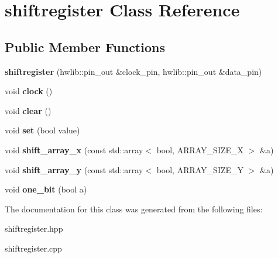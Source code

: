 \hypertarget{classshiftregister}{}\section{shiftregister Class Reference}
\label{classshiftregister}
\subsection*{Public Member Functions}
\begin{DoxyCompactItemize}
\item 
\mbox{\label{classshiftregister_ad72aff9322b0daf648fb3e083e64d2e6}} 
{\bfseries shiftregister} (hwlib\+::pin\+\_\+out \&clock\+\_\+pin, hwlib\+::pin\+\_\+out \&data\+\_\+pin)
\item 
\mbox{\label{classshiftregister_addd97c64978ac4cda3b1bb02e2fc5c71}} 
void {\bfseries clock} ()
\item 
\mbox{\label{classshiftregister_a1c6be3d5eb560d6d15319978948860c3}} 
void {\bfseries clear} ()
\item 
\mbox{\label{classshiftregister_a3a0cb78386c6b02fe35b945fac533309}} 
void {\bfseries set} (bool value)
\item 
\mbox{\label{classshiftregister_af1a05b416c4b2051187ab44ecf9d2222}} 
void {\bfseries shift\+\_\+array\+\_\+x} (const std\+::array$<$ bool, A\+R\+R\+A\+Y\+\_\+\+S\+I\+Z\+E\+\_\+X $>$ \&a)
\item 
\mbox{\label{classshiftregister_a565d20b6a224eb710be9624b305fd855}} 
void {\bfseries shift\+\_\+array\+\_\+y} (const std\+::array$<$ bool, A\+R\+R\+A\+Y\+\_\+\+S\+I\+Z\+E\+\_\+Y $>$ \&a)
\item 
\mbox{\label{classshiftregister_ab69b2359277f622a8b479ffda9a595ad}} 
void {\bfseries one\+\_\+bit} (bool a)
\end{DoxyCompactItemize}


The documentation for this class was generated from the following files\+:\begin{DoxyCompactItemize}
\item 
shiftregister.\+hpp\item 
shiftregister.\+cpp\end{DoxyCompactItemize}
